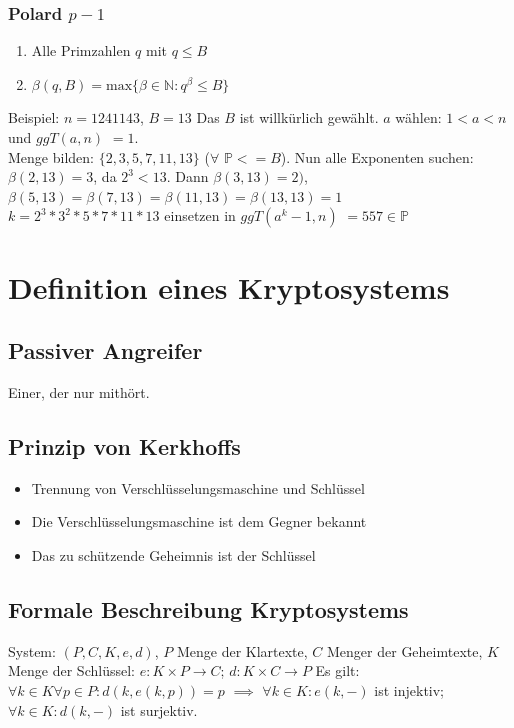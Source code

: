 \documentclass[landscape,twocolumn,a4paper]{article}
\newcommand{\PN}{\mathbb{P}} %
\begin{document}
\subsubsection{Polard $p -1$}
\begin{enumerate}
\item Alle Primzahlen $q$ mit $q \le B$
\item $\beta(q, B) = \text{max}\{\beta \in \mathbb{N}: q^\beta \le B\}$
\end{enumerate}
Beispiel:
$n=1241143$, $B=13$ Das $B$ ist willkürlich gewählt. $a$ wählen: $ 1 < a < n$ und $ggT(a, n)$ $= 1$. \\
Menge bilden: $\{2, 3, 5, 7, 11, 13\}$ ($\forall$ $\PN<=B$). Nun alle Exponenten suchen: $\beta (2, 13) = 3$, da $2^3 < 13$. Dann $\beta (3, 13) = 2)$, 
$\beta (5, 13) = \beta (7, 13) = \beta (11, 13) = \beta (13, 13) = 1$ \\
$k = 2^3 * 3^2 * 5 * 7 * 11 * 13$ einsetzen in $ggT(a^k-1, n)$ $= 557 \in \PN$

\section{Definition eines Kryptosystems}
\subsection{Passiver Angreifer}
Einer, der nur mithört.
\subsection{Prinzip von Kerkhoffs}
\begin{itemize}
	\item Trennung von Verschlüsselungsmaschine und Schlüssel
	\item Die Verschlüsselungsmaschine ist dem Gegner bekannt
	\item Das zu schützende Geheimnis ist der Schlüssel
\end{itemize}
\subsection{Formale Beschreibung Kryptosystems}
System: $(P, C, K, e, d)$, $P$ Menge der Klartexte, $C$ Menger der Geheimtexte, $K$ Menge der Schlüssel:
$e: K \times P \rightarrow C$; $d: K \times C \rightarrow P$
Es gilt: $\forall k \in K \forall p \in P: d (k, e (k, p)) = p$ $\implies$ $\forall k \in K : e(k, -)$ ist injektiv; $\forall k \in K: d(k, -)$ ist surjektiv.
\end{document}
